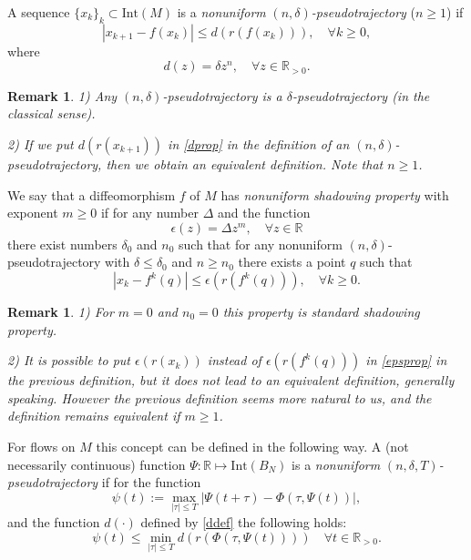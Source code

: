 \documentclass[11pt]{article}
\newcounter{razdel}[section]
\theoremstyle{Mystyle}
\newtheorem{Remark}[razdel]{Remark}
\begin{document}
A sequence $\{x_k\}_k\subset\mbox{Int}(M)$ is a \textit{nonuniform} $(n,\delta)$\textit{-pseudotrajectory} ($n\geq 1$) if 
\begin{equation}
\label{dprop}
|x_{k+1} - f(x_k)|\leq d(r(f(x_k))),\quad\forall k\geq 0,
\end{equation}
where 
\begin{equation}
\label{ddef}
d(z) = \delta z^n,\quad\forall z\in\mathbb{R}_{>0}.
\end{equation}
\begin{Remark}

1) Any $(n,\delta)$-pseudotrajectory is a $\delta$-pseudotrajectory (in the classical sense).

2) If we put $d(r(x_{k+1}))$ in \eqref{dprop} in the definition of an $(n,\delta)$-pseudotrajectory, then %
we obtain an equivalent definition. Note that $n\geq 1$.
\end{Remark}
 
 
We say that a diffeomorphism $f$ of $M$ has \textit{nonuniform shadowing property} with exponent $m\geq 0$ if
for any number $\Delta$ and the function 
\begin{equation}
\label{epsdef}
\epsilon(z) = \Delta z^m,\quad\forall z\in\mathbb{R}
\end{equation} 
there exist numbers $\delta_0$ and $n_0$ 
such that for any nonuniform $(n,\delta)$-pseudotrajectory with $\delta\leq\delta_0$ and $n\geq n_0$ 
there exists a point $q$ such that
\begin{equation}
\label{epsprop}
|x_k - f^k(q)|\leq\epsilon(r(f^k(q))),\quad\forall k\geq 0.
\end{equation}
\begin{Remark}

1) For $m=0$ and $n_0=0$ this property is standard shadowing property.

2) It is possible to put $\epsilon(r(x_k))$ instead of $\epsilon(r(f^k(q)))$ in \eqref{epsprop} in the previous definition, but it does not lead to an equivalent definition, generally speaking. However the previous definition seems more natural to us, and the definition remains equivalent if $m\geq 1$. 
\end{Remark}

For flows on $M$ this concept can be defined in the following way.
A (not necessarily continuous) function $\Psi:\mathbb{R}\mapsto \mbox{Int}(B_N)$ is a \textit{nonuniform} $(n,\delta,T)$\textit{-pseudotrajectory} if
for the function
$$\psi(t) := \max_{|\tau|\leq T}|\Psi(t+\tau) - \Phi(\tau,\Psi(t))|,$$
and the function
$d(\cdot)$ defined by \eqref{ddef}
the following holds:
\begin{equation}
\label{nudpstfl}
\psi(t)\leq \min_{|\tau|\leq T}d(r(\Phi(\tau,\Psi(t))))\quad\forall t\in\mathbb{R}_{>0}.
\end{equation}
\end{document}
